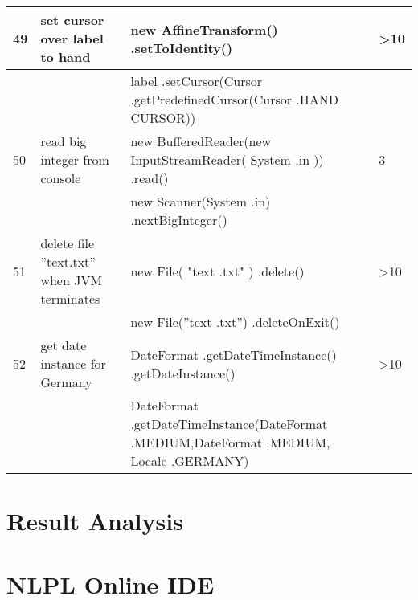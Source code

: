 \begin{longtable}{|p{}|p{}|p{}|p{}|}
		\rowcolor[HTML]{FFCCC9} 
		49                                & set cursor over label to hand                          & new AffineTransform() .setToIdentity()                                                                           & \textgreater{}10                        \\ \hline
		\rowcolor[HTML]{9AFF99} 
		&                                                        & label .setCursor(Cursor .getPredefinedCursor(Cursor .HAND CURSOR))                                               &                                         \\ \hline
		\rowcolor[HTML]{FFCCC9} 
		50                                & read big integer from console                          & new BufferedReader(new InputStreamReader( System .in )) .read()                                                  & 3                                       \\ \hline
		\rowcolor[HTML]{9AFF99} 
		&                                                        & new Scanner(System .in) .nextBigInteger()                                                                        &                                         \\ \hline
		\rowcolor[HTML]{FFCCC9} 
		51                                & delete file ”text.txt” when JVM terminates             & new File( "text .txt" )  .delete()                                                                               & \textgreater{}10                        \\ \hline
		\rowcolor[HTML]{9AFF99} 
		&                                                        & new File(”text .txt”) .deleteOnExit()                                                                            &                                         \\ \hline
		\rowcolor[HTML]{FFCCC9} 
		52                                & get date instance for Germany                          & DateFormat .getDateTimeInstance() .getDateInstance()                                                             & \textgreater{}10                        \\ \hline
		\rowcolor[HTML]{9AFF99} 
		&                                                        & DateFormat .getDateTimeInstance(DateFormat .MEDIUM,DateFormat .MEDIUM, Locale .GERMANY)                          &                                         \\ \hline
		
\end{longtable}

\section{Result Analysis}

\section{NLPL Online IDE}




